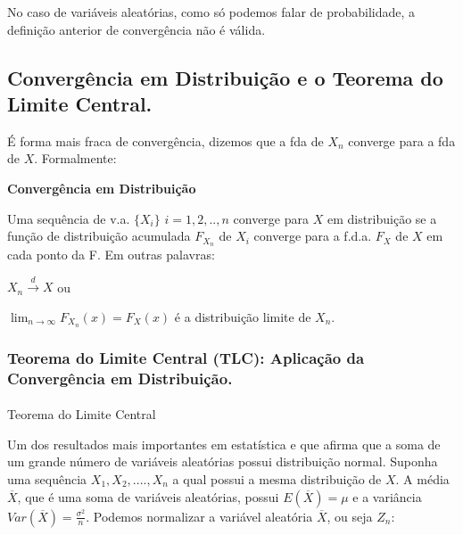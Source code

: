 \documentclass[
  letterpaper,
  DIV=11,
  numbers=noendperiod]{scrartcl}
\makeatletter
\let\oldparagraph\paragraph
\renewcommand{\paragraph}{
    \@ifstar
      \xxxParagraphStar
      \xxxParagraphNoStar
  }
\newcommand{\xxxParagraphStar}[1]{\oldparagraph*{#1}\mbox{}}
\newcommand{\xxxParagraphNoStar}[1]{\oldparagraph{#1}\mbox{}}
\makeatother
\begin{document}
No caso de variáveis aleatórias, como só podemos falar de probabilidade,
a definição anterior de convergência não é válida.

\subsection{Convergência em Distribuição e o Teorema do Limite
Central.}\label{converguxeancia-em-distribuiuxe7uxe3o-e-o-teorema-do-limite-central.}

É forma mais fraca de convergência, dizemos que a fda de \(X_n\)
converge para a fda de \(X\). Formalmente:

\begin{definicao}

\textbf{Convergência em Distribuição}

Uma sequência de v.a. \(\{X_i\}\) \(i=1,2,..,n\) converge para \(X\) em
distribuição se a função de distribuição acumulada \(F_{X_n}\) de
\(X_i\) converge para a f.d.a. \(F_X\) de \(X\) em cada ponto da F. Em
outras palavras:

\hfill\break

\(X_n \overset{d}{\rightarrow} X\) ou

\hfill\break

\(\lim_{n \rightarrow\infty}F_{X_n}(x)=F_{X}(x)\) é a distribuição
limite de \(X_n\).

\end{definicao}

\subsubsection{Teorema do Limite Central (TLC): Aplicação da
Convergência em
Distribuição.}\label{teorema-do-limite-central-tlc-aplicauxe7uxe3o-da-converguxeancia-em-distribuiuxe7uxe3o.}

\paragraph{Teorema do Limite Central}\label{teorema-do-limite-central}

Um dos resultados mais importantes em estatística e que afirma que a
soma de um grande número de variáveis aleatórias possui distribuição
normal. Suponha uma sequência \(X_1, X_2, ...., X_n\) a qual possui a
mesma distribuição de \(X\). A média \(\overline{X}\), que é uma soma de
variáveis aleatórias, possui \(E(\overline{X})=\mu\) e a variância
\(Var(\overline{X})=\frac{\sigma^2}{n}\). Podemos normalizar a variável
aleatória \(\overline{X}\), ou seja \(Z_n\):
\end{document}
